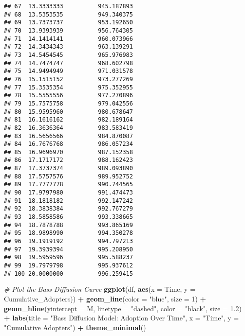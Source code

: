 \documentclass[
]{article}
\newenvironment{Shaded}{\begin{snugshade}}{\end{snugshade}}
\newcommand{\AttributeTok}[1]{\textcolor[rgb]{0.13,0.29,0.53}{#1}}
\newcommand{\CommentTok}[1]{\textcolor[rgb]{0.56,0.35,0.01}{\textit{#1}}}
\newcommand{\DecValTok}[1]{\textcolor[rgb]{0.00,0.00,0.81}{#1}}
\newcommand{\FloatTok}[1]{\textcolor[rgb]{0.00,0.00,0.81}{#1}}
\newcommand{\FunctionTok}[1]{\textcolor[rgb]{0.13,0.29,0.53}{\textbf{#1}}}
\newcommand{\NormalTok}[1]{#1}
\newcommand{\SpecialCharTok}[1]{\textcolor[rgb]{0.81,0.36,0.00}{\textbf{#1}}}
\newcommand{\StringTok}[1]{\textcolor[rgb]{0.31,0.60,0.02}{#1}}
\begin{document}
\begin{verbatim}
## 67  13.3333333          945.187893
## 68  13.5353535          949.340375
## 69  13.7373737          953.192650
## 70  13.9393939          956.764305
## 71  14.1414141          960.073966
## 72  14.3434343          963.139291
## 73  14.5454545          965.976983
## 74  14.7474747          968.602798
## 75  14.9494949          971.031578
## 76  15.1515152          973.277269
## 77  15.3535354          975.352955
## 78  15.5555556          977.270896
## 79  15.7575758          979.042556
## 80  15.9595960          980.678647
## 81  16.1616162          982.189164
## 82  16.3636364          983.583419
## 83  16.5656566          984.870087
## 84  16.7676768          986.057234
## 85  16.9696970          987.152358
## 86  17.1717172          988.162423
## 87  17.3737374          989.093890
## 88  17.5757576          989.952752
## 89  17.7777778          990.744565
## 90  17.9797980          991.474473
## 91  18.1818182          992.147242
## 92  18.3838384          992.767279
## 93  18.5858586          993.338665
## 94  18.7878788          993.865169
## 95  18.9898990          994.350278
## 96  19.1919192          994.797213
## 97  19.3939394          995.208950
## 98  19.5959596          995.588237
## 99  19.7979798          995.937612
## 100 20.0000000          996.259415
\end{verbatim}

\begin{Shaded}
\begin{Highlighting}[]
\CommentTok{\# Plot the Bass Diffusion Curve}
\FunctionTok{ggplot}\NormalTok{(df, }\FunctionTok{aes}\NormalTok{(}\AttributeTok{x =}\NormalTok{ Time, }\AttributeTok{y =}\NormalTok{ Cumulative\_Adopters)) }\SpecialCharTok{+}
  \FunctionTok{geom\_line}\NormalTok{(}\AttributeTok{color =} \StringTok{"blue"}\NormalTok{, }\AttributeTok{size =} \DecValTok{1}\NormalTok{) }\SpecialCharTok{+}
  \FunctionTok{geom\_hline}\NormalTok{(}\AttributeTok{yintercept =}\NormalTok{ M, }\AttributeTok{linetype =} \StringTok{"dashed"}\NormalTok{, }\AttributeTok{color =} \StringTok{"black"}\NormalTok{, }\AttributeTok{size =} \FloatTok{1.2}\NormalTok{) }\SpecialCharTok{+}
  \FunctionTok{labs}\NormalTok{(}\AttributeTok{title =} \StringTok{"Bass Diffusion Model: Adoption Over Time"}\NormalTok{,}
       \AttributeTok{x =} \StringTok{"Time"}\NormalTok{,}
       \AttributeTok{y =} \StringTok{"Cumulative Adopters"}\NormalTok{) }\SpecialCharTok{+}
  \FunctionTok{theme\_minimal}\NormalTok{()}
\end{Highlighting}
\end{Shaded}
\end{document}
